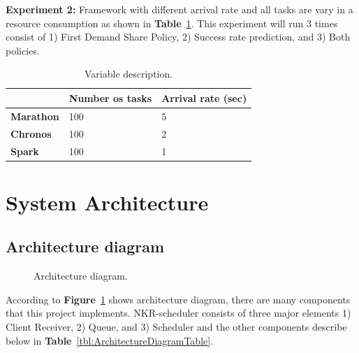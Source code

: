 \documentclass[12pt,oneside,openright,a4paper]{cpe-english-project}
\begin{document}
\textbf{Experiment 2:} Framework with different arrival rate and all tasks are vary in a resource consumption as shown in \textbf{Table}~\ref{tbl:Experiment2}. This experiment will run 3 times consist of 1) First Demand Share Policy, 2) Success rate prediction, and 3) Both policies.

\begin{table}[!h]
\caption{Variable description.}\label{tbl:Experiment2}
\begin{tabular}{|l|l|l|}
\hline
 & \textbf{Number os tasks} & \textbf{Arrival rate (sec)}\\
\hline
\textbf{Marathon} & 100 & 5\\
\hline
\textbf{Chronos} & 100 & 2 \\
\hline
\textbf{Spark} & 100 & 1 \\
\hline
\end{tabular}
\end{table}

\section{System Architecture}

\subsection{Architecture diagram}  

\begin{figure}[!h]\centering
\setlength{\fboxrule}{0mm} %
\setlength{\fboxsep}{0cm}
\caption{Architecture diagram.}\label{fig:ArchitectureDiagram}
\end{figure}

According to \textbf{Figure}~\ref{fig:ArchitectureDiagram} shows architecture diagram, there are many components that this project implements. NKR-scheduler consists of three major elements 1) Client Receiver, 2) Queue, and 3) Scheduler and the other components describe below in \textbf{Table}~\ref{tbl:ArchitectureDiagramTable}.
\end{document}
